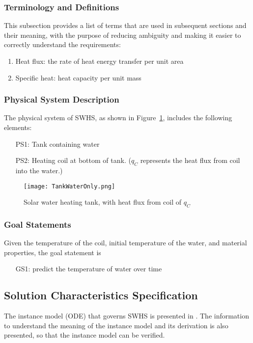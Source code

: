 \documentclass[12pt]{article}
\begin{document}
\subsubsection{Terminology and Definitions}
\label{Sec:TermandDefi}
This subsection provides a list of terms that are used in subsequent sections and their meaning, with the purpose of reducing ambiguity and making it easier to correctly understand the requirements:
\begin{enumerate}
\item{Heat flux: the rate of heat energy transfer per unit area}
\item{Specific heat: heat capacity per unit mass}
\end{enumerate}
\subsubsection{Physical System Description}
\label{Sec:PhysSystDesc}
The physical system of SWHS, as shown in Figure~\ref{Figure:Solawateheattank,withheatfluxfromcoilof}, includes the following elements:
\begin{itemize}
\item[PS1:]Tank containing water
\item[PS2:]Heating coil at bottom of tank. ($q_{C}$ represents the heat flux from coil into the water.)
\end{itemize}
\begin{figure}
\begin{center}
\texttt{[image: TankWaterOnly.png]}
\caption{Solar water heating tank, with heat flux from coil of $q_{C}$}
\label{Figure:Solawateheattank,withheatfluxfromcoilof}
\end{center}
\end{figure}
\subsubsection{Goal Statements}
\label{Sec:GoalStat}
Given the temperature of the coil, initial temperature of the water, and material properties, the goal statement is
\begin{itemize}
\item[GS1:]predict the temperature of water over time
\end{itemize}
\subsection{Solution Characteristics Specification}
\label{Sec:SoluCharSpec}
The instance model (ODE) that governs SWHS is presented in . The information to understand the meaning of the instance model and its derivation is also presented, so that the instance model can be verified.
\end{document}
